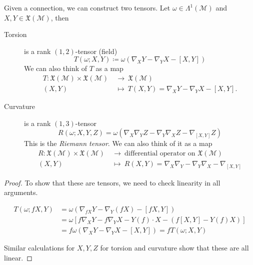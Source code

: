 \begin{claim}
  Given a connection, we can construct two tensors.
  Let $\omega \in \Lambda^{1}(\mathcal{M})$ and $X, Y \in \mathfrak{X}(\mathcal{M})$, then
  \begin{description}
    \item[Torsion] is a rank $(1, 2)$-tensor (field)
      \begin{equation}
        T(\omega; X, Y) \coloneqq \omega(\nabla_X Y - \nabla_Y X - [X, Y])
      \end{equation}
      We can also think of $T$ as a map
      \begin{equation}
        \begin{split}
          T \colon \mathfrak{X}(\mathcal{M}) \times \mathfrak{X}(\mathcal{M}) \ &\to\  \mathfrak{X}(\mathcal{M}) \\
  	(X, Y) \ &\mapsto\  T(X, Y) = \nabla_X Y - \nabla_Y X - [X, Y].
        \end{split}
      \end{equation}
    \item[Curvature] is a rank $(1, 3)$-tensor
      \begin{equation}
        R(\omega; X, Y, Z) = \omega (\nabla_X \nabla_Y Z - \nabla_Y \nabla_X Z - \nabla_{[X, Y]} Z)
      \end{equation}
      This is the \emph{Riemann tensor}. We can also think of it as a map
      \begin{equation}
        \begin{split}
          R \colon \mathfrak{X}(\mathcal{M}) \times \mathfrak{X}(\mathcal{M})\ &\to\  \text{differential operator on } \mathfrak{X}(\mathcal{M}) \\
  	(X, Y) \ &\mapsto\  R(X, Y) = \nabla_X \nabla_Y - \nabla_Y \nabla_X - \nabla_{[X, Y]}
        \end{split}
      \end{equation}
  \end{description}
\end{claim}
\begin{proof}
  To show that these are tensors, we need to check linearity in all arguments.
  \begin{example}[]
    \begin{align}
      T(\omega; fX, Y) &= \omega(\nabla_{fX} Y - \nabla_{Y} (fX) - [fX, Y]) \\
		       &= \omega \left[f \nabla_X Y - f \nabla_Y X - Y(f) \cdot X - (f[X, Y] - Y(f) X)\right] \\
		       &= f \omega (\nabla_X Y - \nabla_Y X - [X, Y]) = f T(\omega; X, Y)
    \end{align}
  \end{example}
  Similar calculations for $X, Y, Z$ for torsion and curvature show that these are all linear.
\end{proof}


